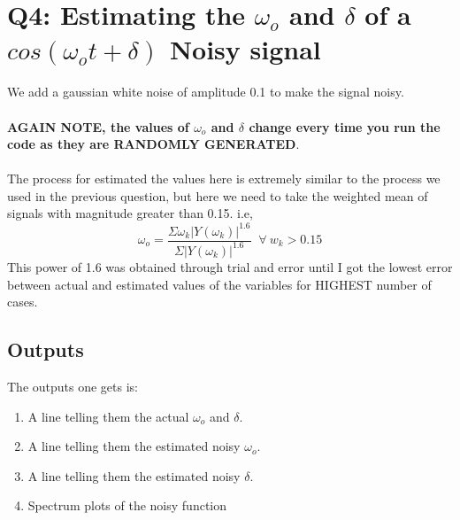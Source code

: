\documentclass[11pt]{article}
\begin{document}
\section{Q4: Estimating the $\omega _o$ and $\delta$ of a $cos(\omega _ot+\delta)$ \textbf{Noisy} signal}
We add a gaussian white noise of amplitude 0.1 to make the signal noisy.\\~\\
\textbf{AGAIN NOTE, the values of $\omega _o$ and $\delta$ change every time you run the code as they are RANDOMLY GENERATED}.\\~\\
The process for estimated the values here is extremely similar to the process we used in the previous question, but here we need to take the weighted mean of signals with magnitude greater than 0.15. i.e,
\begin{equation}
    \omega _o= \frac{\Sigma \omega _k|Y(\omega _k)|^{1.6}}{\Sigma |Y(\omega _k)|^{1.6}} \;\; \forall\:w _k>0.15
\end{equation}
This power of 1.6 was obtained through trial and error until I got the lowest error between actual and estimated values of the variables for HIGHEST number of cases.

\subsection{Outputs}
The outputs one gets is:
\begin{enumerate}
    \item A line telling them the actual $\omega _o$ and $\delta$.
    \item A line telling them the estimated noisy $\omega _o$.
    \item A line telling them the estimated noisy $\delta$.
    \item Spectrum plots of the noisy function
\end{enumerate}
\end{document}
